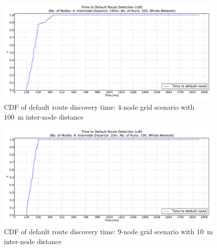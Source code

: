 \begin{figure}[htb]
  \begin{center}
  \vspace{-20pt}
    \leavevmode
      \includegraphics[scale=0.38]
      {Pics/results/4/MRHOF/grid/dist100_montecarlo_cdf_hist.pdf}
   \caption{CDF of default route discovery time: 4-node grid scenario with 100~m inter-node distance}
   \label{fig:4_MRHOF_grid_100_cdf}
  \end{center}
\end{figure}

\begin{figure}[htpb]
  \begin{center}
   \vspace{-20pt}
    \leavevmode
      \includegraphics[scale=0.38]
      {Pics/results/9/MRHOF/grid/dist10_montecarlo_cdf_hist.pdf}
   \caption{CDF of default route discovery time: 9-node grid scenario with 10~m inter-node distance}
   \label{fig:9_MRHOF_grid_10_cdf}
  \end{center}
\end{figure}

